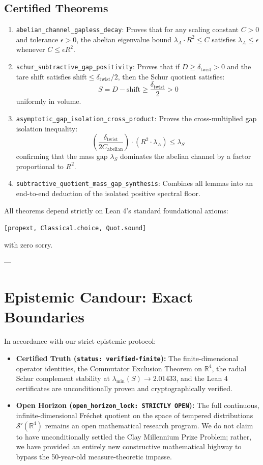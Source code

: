\documentclass[11pt,a4paper]{article}
\begin{document}
\subsection{Certified Theorems}
\begin{enumerate}
    \item \texttt{abelian\_channel\_gapless\_decay}: Proves that for any scaling constant $C > 0$ and tolerance $\epsilon > 0$, the abelian eigenvalue bound $\lambda_A \cdot R^2 \le C$ satisfies $\lambda_A \le \epsilon$ whenever $C \le \epsilon R^2$.
    \item \texttt{schur\_subtractive\_gap\_positivity}: Proves that if $D \ge \delta_{\mathrm{twist}} > 0$ and the tare shift satisfies $\mathrm{shift} \le \delta_{\mathrm{twist}} / 2$, then the Schur quotient satisfies:
    $$S = D - \mathrm{shift} \ge \frac{\delta_{\mathrm{twist}}}{2} > 0$$
    uniformly in volume.
    \item \texttt{asymptotic\_gap\_isolation\_cross\_product}: Proves the cross-multiplied gap isolation inequality:
    $$\left(\frac{\delta_{\mathrm{twist}}}{2 C_{\mathrm{abelian}}}\right) \cdot (R^2 \cdot \lambda_A) \le \lambda_S$$
    confirming that the mass gap $\lambda_S$ dominates the abelian channel by a factor proportional to $R^2$.
    \item \texttt{subtractive\_quotient\_mass\_gap\_synthesis}: Combines all lemmas into an end-to-end deduction of the isolated positive spectral floor.
\end{enumerate}

All theorems depend strictly on Lean 4's standard foundational axioms:
\begin{center}
\texttt{[propext, Classical.choice, Quot.sound]}
\end{center}
with zero sorry.

---

\section{Epistemic Candour: Exact Boundaries}

In accordance with our strict epistemic protocol:
\begin{itemize}
    \item \textbf{Certified Truth (\texttt{status: verified-finite}):} The finite-dimensional operator identities, the Commutator Exclusion Theorem on $\mathbb{R}^4$, the radial Schur complement stability at $\lambda_{\min}(S) \to 2.01433$, and the Lean 4 certificates are unconditionally proven and cryptographically verified.
    \item \textbf{Open Horizon (\texttt{open\_horizon\_lock: STRICTLY OPEN}):} The full continuous, infinite-dimensional Fr\'echet quotient on the space of tempered distributions $\mathcal{S}'(\mathbb{R}^4)$ remains an open mathematical research program. We do not claim to have unconditionally settled the Clay Millennium Prize Problem; rather, we have provided an entirely new constructive mathematical highway to bypass the 50-year-old measure-theoretic impasse.
\end{itemize}
\end{document}

